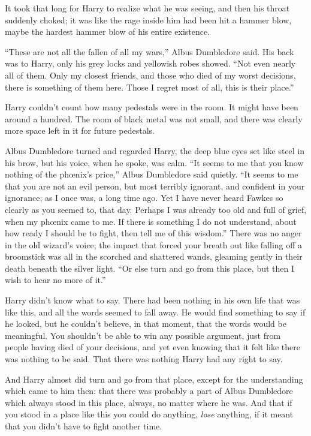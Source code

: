 It took that long for Harry to realize what he was seeing, and then his throat suddenly choked; it was like the rage inside him had been hit a hammer blow, maybe the hardest hammer blow of his entire existence.

“These are not all the fallen of all my wars,” Albus Dumbledore said. His back was to Harry, only his grey locks and yellowish robes showed. “Not even nearly all of them. Only my closest friends, and those who died of my worst decisions, there is something of them here. Those I regret most of all, this is their place.”

Harry couldn’t count how many pedestals were in the room. It might have been around a hundred. The room of black metal was not small, and there was clearly more space left in it for future pedestals.

Albus Dumbledore turned and regarded Harry, the deep blue eyes set like steel in his brow, but his voice, when he spoke, was calm. “It seems to me that you know nothing of the phœnix’s price,” Albus Dumbledore said quietly. “It seems to me that you are not an evil person, but most terribly ignorant, and confident in your ignorance; as I once was, a long time ago. Yet I have never heard Fawkes so clearly as you seemed to, that day. Perhaps I was already too old and full of grief, when my phœnix came to me. If there is something I do not understand, about how ready I should be to fight, then tell me of this wisdom.” There was no anger in the old wizard’s voice; the impact that forced your breath out like falling off a broomstick was all in the scorched and shattered wands, gleaming gently in their death beneath the silver light. “Or else turn and go from this place, but then I wish to hear no more of it.”

Harry didn’t know what to say. There had been nothing in his own life that was like this, and all the words seemed to fall away. He would find something to say if he looked, but he couldn’t believe, in that moment, that the words would be meaningful. You shouldn’t be able to win any possible argument, just from people having died of your decisions, and yet even knowing that it felt like there was nothing to be said. That there was nothing Harry had any right to say.

And Harry almost did turn and go from that place, except for the understanding which came to him then: that there was probably a part of Albus Dumbledore which always stood in this place, always, no matter where he was. And that if you stood in a place like this you could do anything, \emph{lose} anything, if it meant that you didn’t have to fight another time.

